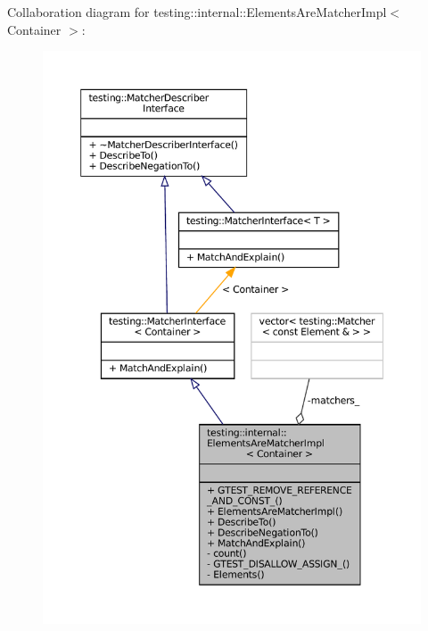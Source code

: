 Collaboration diagram for testing\+:\+:internal\+:\+:Elements\+Are\+Matcher\+Impl$<$ Container $>$\+:
\nopagebreak
\begin{figure}[H]
\begin{center}
\leavevmode
\includegraphics[width=350pt]{classtesting_1_1internal_1_1ElementsAreMatcherImpl__coll__graph}
\end{center}
\end{figure}
